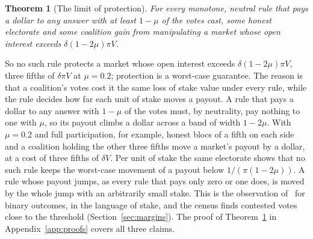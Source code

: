 \documentclass[conference,compsoc]{IEEEtran}
\newtheorem{theorem}{Theorem}
\newcommand{\muparam}{\mu}
\begin{document}
\begin{theorem}[The limit of protection]
\label{thm:limit}
For every monotone, neutral rule that pays a dollar to any answer with at least $1 - \muparam$ of the votes cast, some honest electorate and some coalition gain from manipulating a market whose open interest exceeds $\delta(1 - 2\muparam)\pi V$.
\end{theorem}
 So no such rule protects a market whose open interest exceeds $\delta(1 - 2\muparam)\pi V$, three fifths of $\delta\pi V$ at $\muparam = 0.2$; protection is a worst-case guarantee. The reason is that a coalition's votes cost it the same loss of stake value under every rule, while the rule decides how far each unit of stake moves a payout. A rule that pays a dollar to any answer with $1 - \muparam$ of the votes must, by neutrality, pay nothing to one with $\muparam$, so its payout climbs a dollar across a band of width $1 - 2\muparam$. With $\muparam = 0.2$ and full participation, for example, honest blocs of a fifth on each side and a coalition holding the other three fifths move a market's payout by a dollar, at a cost of three fifths of $\delta V$. Per unit of stake the same electorate shows that no such rule keeps the worst-case movement of a payout below $1/(\pi(1 - 2\muparam))$. A rule whose payout jumps, as every rule that pays only zero or one does, is moved by the whole jump with an arbitrarily small stake. This is the observation of~\cite{freeman2017} for binary outcomes, in the language of stake, and the census finds contested votes close to the threshold (Section~\ref{sec:margins}). The proof of Theorem~\ref{thm:limit} in Appendix~\ref{app:proofs} covers all three claims.
\end{document}
